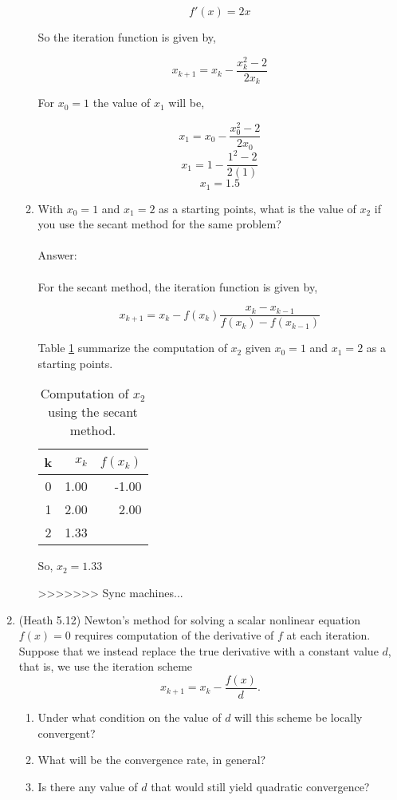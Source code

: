 \documentclass{article}
\begin{document}
\begin{enumerate}
\begin{enumerate}
$$f'(x)=2x$$

So the iteration function is given by,

$$x_{k+1}=x_k-\frac{x_k^2-2}{2x_k}$$

For $x_0=1$ the value of $x_1$ will be,

$$x_{1}=x_0-\frac{x_0^2-2}{2x_0}$$
$$x_{1}=1-\frac{1^2-2}{2(1)}$$
$$x_{1}=1.5$$
\item With $x_0 = 1$ and $x_1 = 2$ as a starting points, what is the value of $x_2$ if you use the secant method for the same problem?
\\
\\
Answer:\\
\\
For the secant method, the iteration function is given by,

$$x_{k+1}=x_k-f(x_k)\frac{x_k-x_{k-1}}{f(x_k)-f(x_{k-1})}$$

Table \ref{tab:q7a} summarize the computation of $x_2$ given $x_0 = 1$ and $x_1 = 2$ as a starting points.

\begin{table}[h]
 \centering
 \begin{center}
\begin{tabular}{crr}
\toprule
k & $x_k$ & $f(x_k)$\\
\midrule
0 & 1.00 & -1.00\\
1 & 2.00 &  2.00\\
2 & 1.33 & \\
\bottomrule
 \end{tabular}
 \end{center}
 \caption{Computation of $x_2$ using the secant method.}
 \label{tab:q7a}
\end{table}

So, $x_2=1.33$
 
>>>>>>> Sync machines...
\end{enumerate}

\item (Heath 5.12) Newton's method for solving a scalar nonlinear equation $f(x) = 0$ requires computation of the derivative of $f$ at each iteration.  Suppose that we instead replace
  the true derivative with a constant value $d$, that is, we use the iteration scheme
$$
x_{k+1} = x_k - \frac{f(x)}{d}.
$$
\begin{enumerate}
\item Under what condition on the value of $d$ will this scheme be locally convergent?
\item What will be the convergence rate, in general?
\item Is there any value of $d$ that would still yield quadratic convergence?
\end{enumerate}


\end{enumerate}
\end{document}
